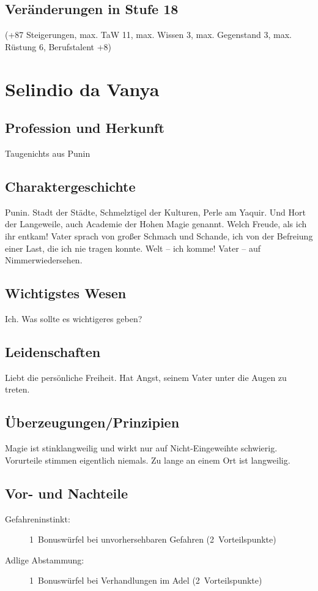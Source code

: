 \subsection{Veränderungen in Stufe 18}
(+87 Steigerungen, max. TaW 11, max. Wissen 3, max. Gegenstand 3, max. Rüstung 6, Berufstalent +8)




\newpage\section{Selindio da Vanya}\label{TaugenichtsPunin}
\subsection{Profession und Herkunft}
Taugenichts aus Punin

\subsection{Charaktergeschichte}
Punin. Stadt der Städte, Schmelztigel der Kulturen, Perle am Yaquir. Und Hort der Langeweile, auch Academie der Hohen Magie genannt. Welch Freude, als ich ihr entkam! Vater sprach von großer Schmach und Schande, ich von der Befreiung einer Last, die ich nie tragen konnte. Welt -- ich komme! Vater -- auf Nimmerwiedersehen.

\subsection{Wichtigstes Wesen}
Ich. Was sollte es wichtigeres geben?

\subsection{Leidenschaften}
Liebt die persönliche Freiheit. Hat Angst, seinem Vater unter die Augen zu treten.

\subsection{Überzeugungen/Prinzipien}
Magie ist stinklangweilig und wirkt nur auf Nicht-Eingeweihte schwierig. Vorurteile stimmen eigentlich niemals. Zu lange an einem Ort ist langweilig.

\subsection{Vor- und Nachteile}
\begin{description}
\item[Gefahreninstinkt:] 1~Bonuswürfel bei unvorhersehbaren Gefahren (2~Vorteilspunkte)
\item[Adlige Abstammung:] 1~Bonuswürfel bei Verhandlungen im Adel (2~Vorteilspunkte)
\end{description}

